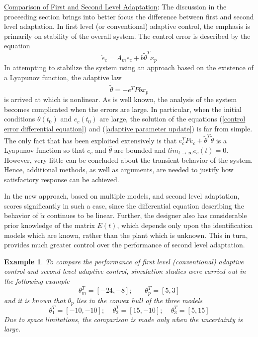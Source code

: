 \documentclass[conference]{IEEEtran}
\newtheorem{Example}{Example}
\begin{document}
{\large \underline{Comparison of First and Second Level Adaptation}}: The discussion in the proceeding section brings into better focus the difference between first and second level adaptation. In first level (or conventional) adaptive control, the emphasis is primarily on stability of the overall system. The control error is described by the equation
\begin{equation}
\label{control error differential equation}
\dot{e}_{c}=A_{m}e_{c}+b\tilde{\theta}^{T}x_{p}
\end{equation}
In attempting to stabilize the system using an approach based on the existence of a Lyapunov function, the adaptive law
\begin{equation}
\label{adaptive parameter update}
\dot{\tilde{\theta}}=-e^{T}Pbx_{p}
\end{equation}
is arrived at which is nonlinear. As is well known, the analysis of the system becomes complicated when the errors are large. In particular, when the initial conditions $\theta(t_{0})$ and $e_{c}(t_{0})$ are large, the solution of the equations (\ref{control error differential equation}) and (\ref{adaptive parameter update}) is far from simple. The only fact that has been exploited extensively is that $e_{c}^{T}Pe_{c}+\tilde{\theta}^{T}\tilde{\theta}$ is a Lyapunov function so that $e_{c}$ and $\hat{\theta}$ are bounded and $lim_{t\to\infty}e_{c}(t)=0$. However, very little can be concluded about the transient behavior of the system. Hence, additional methods, as well as arguments, are needed to justify how satisfactory response can be achieved.

 In the new approach, based on multiple models, and second level adaptation, scores significantly in such a case, since the differential equation describing the behavior of $\tilde{\alpha}$ continues to be linear. Further, the designer also has considerable prior knowledge of the matrix $E(t)$, which depends only upon the identification models which are known, rather than the plant which is unknown. This in turn, provides much greater control over the performance of second level adaptation.

 \begin{Example}
 To compare the performance of first level (conventional) adaptive control and second level adaptive control, simulation studies were carried out in the following example
\begin{equation*}
\theta_{m}^{T}=[-24,-8];\ \ \ \ \ \ \ \ \theta_{p}^{T}=[5,3]
\end{equation*}
and it is known that $\theta_{p}$ lies in the convex hull of the three models
\begin{equation*}
\theta_{1}^{T}=[-10,-10];\ \ \ \ \ \theta_{2}^{T}=[15,-10];\ \ \ \ \ \theta_{3}^{T}=[5,15]
\end{equation*}
Due to space limitations, the comparison is made only when the uncertainty is large.
 \end{Example}
\end{document}
